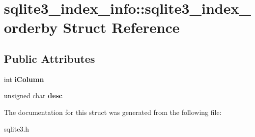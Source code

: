 \hypertarget{structsqlite3__index__info_1_1sqlite3__index__orderby}{}\section{sqlite3\+\_\+index\+\_\+info\+:\+:sqlite3\+\_\+index\+\_\+orderby Struct Reference}
\label{structsqlite3__index__info_1_1sqlite3__index__orderby}
\subsection*{Public Attributes}
\begin{DoxyCompactItemize}
\item 
\mbox{\label{structsqlite3__index__info_1_1sqlite3__index__orderby_a266396085bfda9acef3f13eaa170cd2f}} 
int {\bfseries i\+Column}
\item 
\mbox{\label{structsqlite3__index__info_1_1sqlite3__index__orderby_a0586d1b5d36221af96aeba8cfc56e9c6}} 
unsigned char {\bfseries desc}
\end{DoxyCompactItemize}


The documentation for this struct was generated from the following file\+:\begin{DoxyCompactItemize}
\item 
sqlite3.\+h\end{DoxyCompactItemize}
